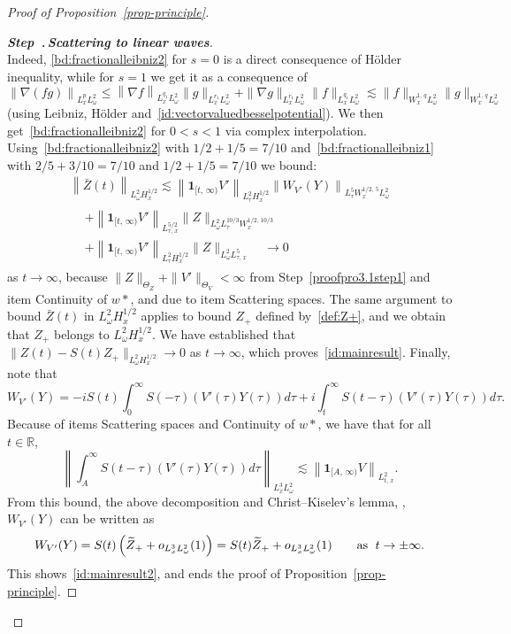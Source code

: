 \documentclass[AHL, Unicode, longabstracts,published]{cedram}
\newcommand{\R}{\mathbb{R}}
\newcommand{\bfun}{\mathbf{1}}
\newcounter{stepcount}
\newenvironment{step}[1]{\refstepcounter{stepcount}\begin{proof}[{\bf{Step~\thestepcount}{.\,\emph{#1}}}]}{\let\qed\relax\end{proof}}
\let\oldtilde\tilde
\renewcommand*{\tilde}[1]{\mathchoice{\widetilde{#1}}{\widetilde{#1}}{\oldtilde{#1}}{\oldtilde{#1}}}
\begin{document}
\begin{proof}[Proof of Proposition~\ref{prop-principle}]
\begin{step}{{Scattering to linear waves}}
\begin{equation}
\end{equation}
Indeed, \eqref{bd:fractionalleibniz2} for $s=0$ is a direct consequence of H\"older inequality, while for $s=1$ we get it as a consequence of
\[
\left\| \nabla (fg) \right\|_{L^p_x L^2_\omega}\leq \left\| \nabla f \right\|_{L^{q_1}_x L^2_\omega}\| g \|_{L^{r_1}_x L^2_\omega}+\| \nabla g \|_{L^{r_1}_x L^2_\omega}\| f \|_{L^{q_1}_x L^2_\omega}\lesssim \| f \|_{W^{1,\,q}_xL^2_\omega} \| g \|_{W^{1,\,q}_xL^2_\omega}
\]
(using Leibniz, H\"older and~\eqref{id:vectorvaluedbesselpotential}). We then get~\eqref{bd:fractionalleibniz2} for $0<s<1$ via complex interpolation. Using~\eqref{bd:fractionalleibniz2} with $1/2+1/5=7/10$ and~\eqref{bd:fractionalleibniz1} with $2/5+3/10=7/10$ and $1/2+1/5=7/10$ we bound:
\begin{multline*}
\left\| \bar Z(t)\right\|_{L^2_\omega H^{1/2}_x}
 \lesssim \left\|\bfun_{[t,\,\infty)}V'\right\|_{L^2_{\tau}H^{1/2}_x} \left\|W_{V'}(Y)\right\|_{L^{5}_\tau W^{1/2,\,5}_x L^2_\omega}\\
\begin{aligned}
&+ \left\|\bfun_{[t,\,\infty)}V'\right\|_{L^{5/2}_{\tau,\,x}} \|Z\|_{L^2_\omega L^{10/3}_\tau W^{1/2,\,10/3}_x}\\
&+ \left\|\bfun_{[t,\,\infty)}V'\right\|_{L^{2}_{\tau}H^{1/2}_x } \|Z\|_{L^2_\omega L^{5}_{\tau,\,x}} \quad \longrightarrow 0
\end{aligned}
\end{multline*}
as $t\rightarrow \infty$, because $\| Z \|_{\Theta_Z}+\| V' \|_{\Theta_V}<\infty$ from Step~\ref{proofpro3.1step1} and item Continuity of $w*$, and due to item Scattering spaces. The same argument to bound $\bar Z(t)$ in $L^2_\omega H^{1/2}_x$ applies to bound $Z_+$ defined by~\eqref{def:Z+}, and we obtain that $Z_+$ belongs to $L^2_\omega H^{1/2}_x$. We have established that $ \|Z(t) - S(t)Z_+\|_{L^2_{\omega} H^{1/2}_x}\rightarrow 0$ as $t\rightarrow \infty$, which proves~\eqref{id:mainresult}. Finally, note that
\[
W_{V'}(Y) = -iS(t)\int_{0}^\infty S(-\tau) (V'(\tau) Y(\tau)) d\tau + i\int_{t}^\infty S(t-\tau) (V'(\tau) Y(\tau)) d\tau.
\]
Because of items Scattering spaces and Continuity of $w*$, we have that for all $t \in \R$,
\[
\left\|\int_{A}^\infty S(t-\tau) \left(V'(\tau) Y(\tau)\right) d\tau \right\|_{L^3_x L^2_\omega} \lesssim \left\|\bfun_{[A,\,\infty)} V\right\|_{L^2_{t,\,x}}.
\]
From this bound, the above decomposition and Christ--Kiselev's lemma, \cite{ChKi}, $W_{V'}(Y)$ can be written as
\[
W_{V'}(Y) = S(t)\left(\tilde Z_++ o_{L^3_x L^2_\omega}(1)\right) = S(t) \tilde Z_+ + o_{L^3_x L^2_\omega}(1)\qquad \text{as }\; t\rightarrow \pm \infty.
\]
This shows~\eqref{id:mainresult2}, and ends the proof of Proposition~\ref{prop-principle}.
\end{step}
\end{proof}
\end{document}
